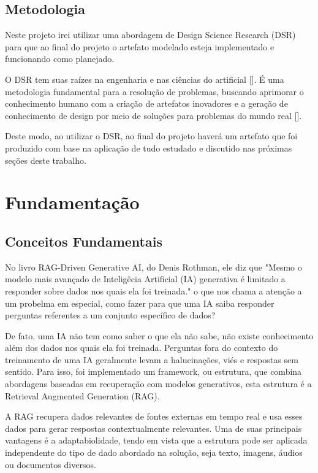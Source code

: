 \documentclass[a4paper, 12pt]{article}
\begin{document}
    \subsection{Metodologia}
    Neste projeto irei utilizar uma abordagem de Design Science Research (DSR) para que ao final do projeto o artefato modelado esteja implementado e funcionando como planejado.

    O DSR tem suas raízes na engenharia e nas ciências do artificial [\textcite{simon_1996}]. É uma metodologia fundamental para a resolução de problemas, buscando aprimorar o conhecimento humano com a criação de artefatos inovadores e a geração de conhecimento de design por meio de soluções para problemas do mundo real [\textcite{design_science}].
    
    Deste modo, ao utilizar o DSR, ao final do projeto haverá um artefato que foi produzido com base na aplicação de tudo estudado e discutido nas próximas seções deste trabalho.
    
    \clearpage

    \section{Fundamentação}

    \subsection{Conceitos Fundamentais}

    No livro RAG-Driven Generative AI, do Denis Rothman, ele diz que "Mesmo o modelo mais avançado de Inteligêcia Artificial (IA) generativa é limitado a responder sobre dados nos quais ela foi treinada." \textcite{rothman} o que nos chama a atenção a um probelma em especial, como fazer para que uma IA saiba responder perguntas referentes a um conjunto específico de dados?

    De fato, uma IA não tem como saber o que ela não sabe, não existe conhecimento além dos dados nos quais ela foi treinada. Perguntas fora do contexto do treinamento de uma IA geralmente levam a halucinações, viés e respostas sem sentido. Para isso, foi implementado um framework, ou estrutura, que combina abordagens baseadas em recuperação com modelos generativos, esta estrutura é a Retrieval Augmented Generation (RAG).

    A RAG recupera dados relevantes de fontes externas em tempo real e usa esses dados para gerar respostas contextualmente relevantes. Uma de suas principais vantagens é a adaptabiolidade, tendo em vista que a estrutura pode ser aplicada independente do tipo de dado abordado na solução, seja texto, imagens, áudios ou documentos diversos.
\end{document}
